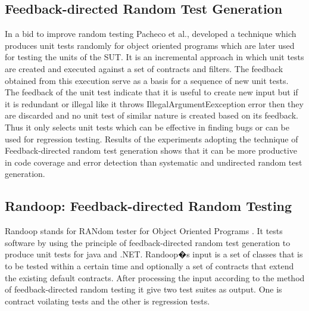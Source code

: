 \subsection{Feedback-directed Random Test Generation}
In a bid to improve random testing Pacheco et al., \cite{Pacheco2007} developed a technique which produces unit tests randomly for object oriented programs which are later used for testing the units of the SUT. It is an incremental approach in which unit tests are created and executed against a set of contracts and filters. The feedback obtained from this execution serve as a basis for a sequence of new unit tests. The feedback of the unit test indicate that it is useful to create new input but if it is redundant or illegal like it throws IllegalArgumentEexception error then they are discarded and no unit test of similar nature is created based on its feedback. Thus it only selects unit tests which can be effective in finding bugs or can be used for regression testing.
Results of the experiments adopting the technique of Feedback-directed random test generation shows that it can be more productive in code coverage and error detection than systematic and undirected random test generation.

\subsection{Randoop: Feedback-directed Random Testing}
Randoop stands for RANdom tester for Object Oriented Programs \cite{Pacheco2007b}. It tests software by using the principle of feedback-directed random test generation to produce unit tests for java and .NET. Randoop�s input is a set of classes that is to be tested within a certain time and optionally a set of contracts that extend the existing default contracts. After processing the input according to the method of feedback-directed random testing it give two test suites as output. One is contract voilating tests and the other is regression tests.




